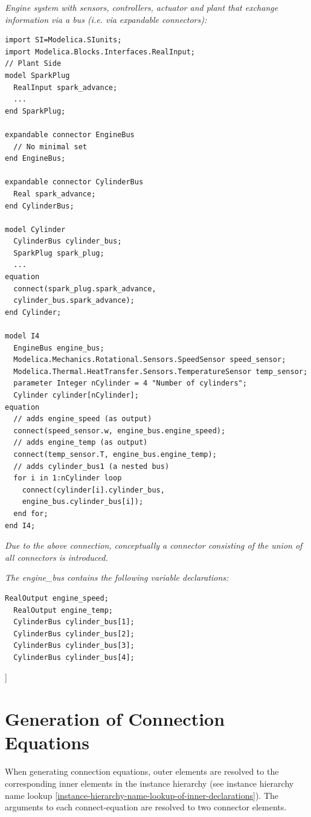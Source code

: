 \documentclass[10pt,a4paper]{report}
\def\doublelabel#1{\label{#1}}
\begin{document}
\emph{Engine system with sensors, controllers, actuator and plant that
exchange information via a bus (i.e. via expandable connectors):}
\begin{lstlisting}[language=modelica]
import SI=Modelica.SIunits;
import Modelica.Blocks.Interfaces.RealInput;
// Plant Side
model SparkPlug
  RealInput spark_advance;
  ...
end SparkPlug;

expandable connector EngineBus
  // No minimal set
end EngineBus;

expandable connector CylinderBus
  Real spark_advance;
end CylinderBus;

model Cylinder
  CylinderBus cylinder_bus;
  SparkPlug spark_plug;
  ...
equation
  connect(spark_plug.spark_advance,
  cylinder_bus.spark_advance);
end Cylinder;

model I4
  EngineBus engine_bus;
  Modelica.Mechanics.Rotational.Sensors.SpeedSensor speed_sensor;
  Modelica.Thermal.HeatTransfer.Sensors.TemperatureSensor temp_sensor;
  parameter Integer nCylinder = 4 "Number of cylinders";
  Cylinder cylinder[nCylinder];
equation
  // adds engine_speed (as output)
  connect(speed_sensor.w, engine_bus.engine_speed);
  // adds engine_temp (as output)
  connect(temp_sensor.T, engine_bus.engine_temp);
  // adds cylinder_bus1 (a nested bus)
  for i in 1:nCylinder loop
    connect(cylinder[i].cylinder_bus,
    engine_bus.cylinder_bus[i]);
  end for;
end I4;
\end{lstlisting}
\emph{Due to the above connection, conceptually a connector consisting
of the union of all connectors is introduced.}

\emph{The engine\_bus contains the following variable declarations:}
\begin{lstlisting}[language=modelica]
  RealOutput engine_speed;
  RealOutput engine_temp;
  CylinderBus cylinder_bus[1];
  CylinderBus cylinder_bus[2];
  CylinderBus cylinder_bus[3];
  CylinderBus cylinder_bus[4];
\end{lstlisting}
{]}

\section{Generation of Connection Equations}\doublelabel{generation-of-connection-equations}

When generating connection equations, outer elements are resolved to the
corresponding inner elements in the instance hierarchy (see instance
hierarchy name lookup \ref{instance-hierarchy-name-lookup-of-inner-declarations}). The arguments to each connect-equation are
resolved to two connector elements.
\end{document}
